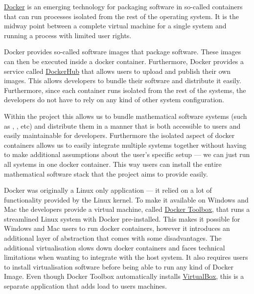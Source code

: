 \documentclass{deliverablereport}
\begin{document}
\href{https://www.docker.com}{Docker} is an emerging technology for
packaging software in so-called containers that can run processes
isolated from the rest of the operating system. It is the midway point
between a complete virtual machine for a single system and running a
process with limited user rights.

Docker provides so-called software images that package software. These
images can then be executed inside a docker container. Furthermore,
Docker provides a service called
\href{https://hub.docker.com/}{DockerHub} that allows users to upload
and publish their own images. This allows developers to bundle their
software and distribute it easily. Furthermore, since each container
runs isolated from the rest of the systems, the developers do not have
to rely on any kind of other system configuration.

Within the \ODK project this allows us to bundle mathematical software
systems (such as \GAP, \Sage, etc) and distribute them in a manner
that is both accessible to users and easily maintainable for
developers. Furthermore the isolated aspect of docker containers
allows us to easily integrate multiple systems together without having
to make additional assumptions about the user's specific setup --- we
can just run all systems in one docker container. This way users can
install the entire mathematical software stack that the \ODK project
aims to provide easily.

Docker was originally a Linux only application --- it relied on a lot
of functionality provided by the Linux kernel. To make it available on
Windows and Mac the developers provide a virtual machine, called
\href{https://www.docker.com/products/docker-toolbox}{Docker Toolbox},
that runs a streamlined Linux system with Docker pre-installed. This
makes it possible for Windows and Mac users to run docker containers,
however it introduces an additional layer of abstraction that comes
with some disadvantages. The additional virtualisation slows down
docker containers and faces technical limitations when wanting to
integrate with the host system. It also requires users to install
virtualisation software before being able to run any kind of Docker
Image. Even though Docker Toolbox automatically installs
\href{https://www.virtualbox.org/}{VirtualBox}, this is a separate
application that adds load to users machines.
\end{document}
